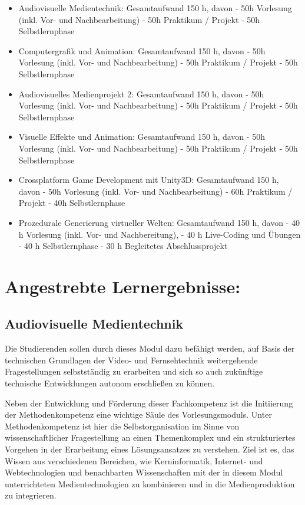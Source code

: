 \begin{itemize}
\item
  Audiovisuelle Medientechnik: Gesamtaufwand 150 h, davon - 50h
  Vorlesung (inkl. Vor- und Nachbearbeitung) - 50h Praktikum / Projekt -
  50h Selbstlernphase
\item
  Computergrafik und Animation: Gesamtaufwand 150 h, davon - 50h
  Vorlesung (inkl. Vor- und Nachbearbeitung) - 50h Praktikum / Projekt -
  50h Selbstlernphase
\item
  Audiovisuelles Medienprojekt 2: Gesamtaufwand 150 h, davon - 50h
  Vorlesung (inkl. Vor- und Nachbearbeitung) - 50h Praktikum / Projekt -
  50h Selbstlernphase
\item
  Visuelle Effekte und Animation: Gesamtaufwand 150 h, davon - 50h
  Vorlesung (inkl. Vor- und Nachbearbeitung) - 50h Praktikum / Projekt -
  50h Selbstlernphase
\item
  Crossplatform Game Development mit Unity3D: Gesamtaufwand 150 h, davon
  - 50h Vorlesung (inkl. Vor- und Nachbearbeitung) - 60h Praktikum /
  Projekt - 40h Selbstlernphase
\item
  Prozedurale Generierung virtueller Welten: Gesamtaufwand 150 h, davon
  - 40 h Vorlesung (inkl. Vor- und Nachbereitung), - 40 h Live-Coding
  und Übungen - 40 h Selbstlernphase - 30 h Begleitetes Abschlussprojekt
\end{itemize}

\section*{Angestrebte
Lernergebnisse:}\label{angestrebte-lernergebnisse-25}

\subsection*{Audiovisuelle
Medientechnik}\label{audiovisuelle-medientechnik}

Die Studierenden sollen durch dieses Modul dazu befähigt werden, auf
Basis der technischen Grundlagen der Video- und Fernsehtechnik
weitergehende Fragestellungen selbstständig zu erarbeiten und sich so
auch zukünftige technische Entwicklungen autonom erschließen zu können.

Neben der Entwicklung und Förderung dieser Fachkompetenz ist die
Initiierung der Methodenkompetenz eine wichtige Säule des
Vorlesungsmoduls. Unter Methodenkompetenz ist hier die
Selbstorganisation im Sinne von wissenschaftlicher Fragestellung an
einen Themenkomplex und ein strukturiertes Vorgehen in der Erarbeitung
eines Lösungsansatzes zu verstehen. Ziel ist es, das Wissen aus
verschiedenen Bereichen, wie Kerninformatik, Internet- und
Webtechnologien und benachbarten Wissenschaften mit der in diesem Modul
unterrichteten Medientechnologien zu kombinieren und in die
Medienproduktion zu integrieren.

